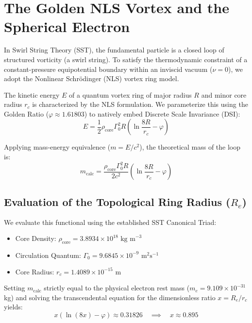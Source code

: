 \documentclass[11pt]{article}
\newcommand{\rc}{r_c}                                    %
\newcommand{\rhocore}{\rho_{\text{core}}}
\newcommand{\GammaSST}{\Gamma_0}
\begin{document}
    \section{The Golden NLS Vortex and the Spherical Electron}
        \label{sec:nls_core}

        In Swirl String Theory (SST), the fundamental particle is a closed loop of structured vorticity (a swirl string). To satisfy the thermodynamic constraint of a constant-pressure equipotential boundary within an inviscid vacuum ($\nu=0$), we adopt the Nonlinear Schrödinger (NLS) vortex ring model.

        The kinetic energy $E$ of a quantum vortex ring of major radius $R$ and minor core radius $\rc$ is characterized by the NLS formulation. We parameterize this using the Golden Ratio ($\varphi \approx 1.61803$) to natively embed Discrete Scale Invariance (DSI):
        \begin{equation}
            E = \frac{1}{2} \rhocore \GammaSST^2 R \left( \ln \frac{8R}{\rc} - \varphi \right)
        \end{equation}

        Applying mass-energy equivalence ($m = E/c^2$), the theoretical mass of the loop is:
        \begin{equation}
            m_{\text{calc}} = \frac{\rhocore \GammaSST^2 R}{2 c^2} \left( \ln \frac{8R}{\rc} - \varphi \right)
        \end{equation}

        \subsection{Evaluation of the Topological Ring Radius ($R_e$)}

            We evaluate this functional using the established SST Canonical Triad:
            \begin{itemize}
                \item Core Density: $\rhocore = 3.8934 \times 10^{18} \text{ kg m}^{-3}$
                \item Circulation Quantum: $\GammaSST = 9.6845 \times 10^{-9} \text{ m}^2 \text{s}^{-1}$
                \item Core Radius: $\rc = 1.4089 \times 10^{-15} \text{ m}$
            \end{itemize}

            Setting $m_{\text{calc}}$ strictly equal to the physical electron rest mass ($m_e = 9.109 \times 10^{-31}$ kg) and solving the transcendental equation for the dimensionless ratio $x = R_e / \rc$ yields:
            \begin{equation}
                x \left( \ln(8x) - \varphi \right) \approx 0.31826 \quad \implies \quad x \approx 0.895
            \end{equation}
\end{document}
